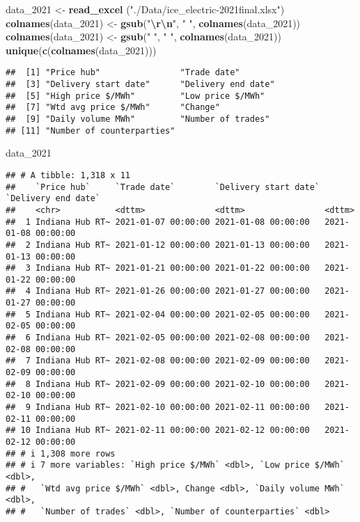 \documentclass[
]{article}
\newenvironment{Shaded}{\begin{snugshade}}{\end{snugshade}}
\newcommand{\FunctionTok}[1]{\textcolor[rgb]{0.13,0.29,0.53}{\textbf{#1}}}
\newcommand{\NormalTok}[1]{#1}
\newcommand{\OtherTok}[1]{\textcolor[rgb]{0.56,0.35,0.01}{#1}}
\newcommand{\SpecialCharTok}[1]{\textcolor[rgb]{0.81,0.36,0.00}{\textbf{#1}}}
\newcommand{\StringTok}[1]{\textcolor[rgb]{0.31,0.60,0.02}{#1}}
\begin{document}
\begin{Shaded}
\begin{Highlighting}[]
\NormalTok{data\_2021 }\OtherTok{\textless{}{-}} \FunctionTok{read\_excel}\NormalTok{ (}\StringTok{"./Data/ice\_electric{-}2021final.xlsx"}\NormalTok{)}
\FunctionTok{colnames}\NormalTok{(data\_2021) }\OtherTok{\textless{}{-}} \FunctionTok{gsub}\NormalTok{(}\StringTok{"}\SpecialCharTok{\textbackslash{}r\textbackslash{}n}\StringTok{"}\NormalTok{, }\StringTok{" "}\NormalTok{, }\FunctionTok{colnames}\NormalTok{(data\_2021))}
\FunctionTok{colnames}\NormalTok{(data\_2021) }\OtherTok{\textless{}{-}} \FunctionTok{gsub}\NormalTok{(}\StringTok{"  "}\NormalTok{, }\StringTok{" "}\NormalTok{, }\FunctionTok{colnames}\NormalTok{(data\_2021))}
\FunctionTok{unique}\NormalTok{(}\FunctionTok{c}\NormalTok{(}\FunctionTok{colnames}\NormalTok{(data\_2021)))}
\end{Highlighting}
\end{Shaded}

\begin{verbatim}
##  [1] "Price hub"                "Trade date"              
##  [3] "Delivery start date"      "Delivery end date"       
##  [5] "High price $/MWh"         "Low price $/MWh"         
##  [7] "Wtd avg price $/MWh"      "Change"                  
##  [9] "Daily volume MWh"         "Number of trades"        
## [11] "Number of counterparties"
\end{verbatim}

\begin{Shaded}
\begin{Highlighting}[]
\NormalTok{data\_2021}
\end{Highlighting}
\end{Shaded}

\begin{verbatim}
## # A tibble: 1,318 x 11
##    `Price hub`     `Trade date`        `Delivery start date` `Delivery end date`
##    <chr>           <dttm>              <dttm>                <dttm>             
##  1 Indiana Hub RT~ 2021-01-07 00:00:00 2021-01-08 00:00:00   2021-01-08 00:00:00
##  2 Indiana Hub RT~ 2021-01-12 00:00:00 2021-01-13 00:00:00   2021-01-13 00:00:00
##  3 Indiana Hub RT~ 2021-01-21 00:00:00 2021-01-22 00:00:00   2021-01-22 00:00:00
##  4 Indiana Hub RT~ 2021-01-26 00:00:00 2021-01-27 00:00:00   2021-01-27 00:00:00
##  5 Indiana Hub RT~ 2021-02-04 00:00:00 2021-02-05 00:00:00   2021-02-05 00:00:00
##  6 Indiana Hub RT~ 2021-02-05 00:00:00 2021-02-08 00:00:00   2021-02-08 00:00:00
##  7 Indiana Hub RT~ 2021-02-08 00:00:00 2021-02-09 00:00:00   2021-02-09 00:00:00
##  8 Indiana Hub RT~ 2021-02-09 00:00:00 2021-02-10 00:00:00   2021-02-10 00:00:00
##  9 Indiana Hub RT~ 2021-02-10 00:00:00 2021-02-11 00:00:00   2021-02-11 00:00:00
## 10 Indiana Hub RT~ 2021-02-11 00:00:00 2021-02-12 00:00:00   2021-02-12 00:00:00
## # i 1,308 more rows
## # i 7 more variables: `High price $/MWh` <dbl>, `Low price $/MWh` <dbl>,
## #   `Wtd avg price $/MWh` <dbl>, Change <dbl>, `Daily volume MWh` <dbl>,
## #   `Number of trades` <dbl>, `Number of counterparties` <dbl>
\end{verbatim}
\end{document}
